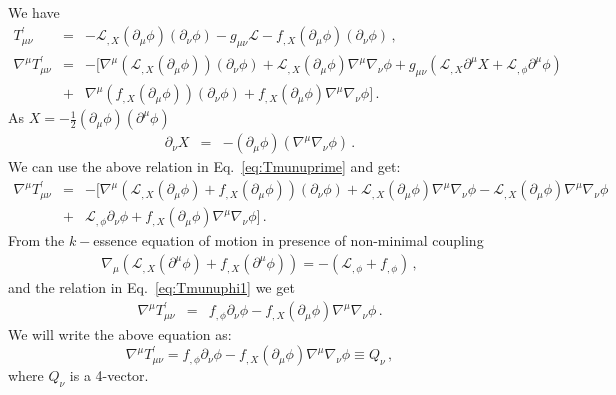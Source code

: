 \documentclass[a4paper,12pt]{article}
\begin{document}
We have
\begin{eqnarray}
T^{\prime}_{\mu\nu} &=& -\mathcal{L}_{,X} (\partial_{\mu}\phi)(\partial_{\nu}\phi) - g_{\mu\nu}\mathcal{L} - f_{,X}(\partial_{\mu}\phi)(\partial_{\nu}\phi)\,,\nonumber\\
\nabla^{\mu} T^{\prime}_{\mu\nu} &=& -[\nabla^{\mu} \left(\mathcal{L}_{,X}(\partial_{\mu}\phi)\right)(\partial_{\nu}\phi)+\mathcal{L}_{,X} (\partial_{\mu}\phi) \nabla^{\mu} \nabla_{\nu} \phi + g_{\mu\nu} (\mathcal{L}_{,X}\partial^{\mu}X+\mathcal{L}_{,\phi}\partial^{\mu}\phi) \nonumber\\
&+& \nabla^{\mu} \left(f_{,X}(\partial_{\mu}\phi)\right)(\partial_{\nu}\phi)+f_{,X} (\partial_{\mu}\phi) \nabla^{\mu} \nabla_{\nu} \phi]\,.
\label{eq:Tmunuprime}
\end{eqnarray}
As $X = -\frac12 {(\partial_{\mu}\phi)}{(\partial^{\mu}\phi)}$
\begin{eqnarray}
\partial_{\nu} X &=& -(\partial_{\mu}\phi) (\nabla^{\mu}\nabla_{\nu} \phi)\,.\nonumber
\end{eqnarray}
We can use the above relation in Eq.~\eqref{eq:Tmunuprime} and get:
\begin{eqnarray}
\nabla^{\mu} T^{\prime}_{\mu\nu} &=& -[\nabla^{\mu}\left(\mathcal{L}_{,X} (\partial_{\mu}\phi) +f_{,X}(\partial_{\mu}\phi)\right)(\partial_{\nu}\phi) +\mathcal{L}_{,X} (\partial_{\mu}\phi) \nabla^{\mu} \nabla_{\nu} \phi -\mathcal{L}_{,X} (\partial_{\mu}\phi) \nabla^{\mu} \nabla_{\nu} \phi \nonumber\\
&+& \mathcal{L}_{,\phi}\partial_{\nu}\phi +f_{,X} (\partial_{\mu}\phi) \nabla^{\mu} \nabla_{\nu} \phi]\,. 
\label{eq:Tmunuphi1}
\end{eqnarray}
From the $k-$essence equation of motion in presence of non-minimal coupling
\begin{eqnarray}
\nabla_{\mu}\left(\mathcal{L}_{,X} (\partial^{\mu}\phi) +f_{,X}(\partial^{\mu}\phi)\right) = -(\mathcal{L}_{,\phi}+f_{,\phi})\,,\nonumber
\end{eqnarray}
and the relation in Eq.~\eqref{eq:Tmunuphi1} we get
\begin{eqnarray}
\nabla^{\mu} T^{\prime}_{\mu\nu} &=&  f_{,\phi}\partial_{\nu}\phi - f_{,X}(\partial_{\mu}\phi) \nabla^{\mu} \nabla_{\nu} \phi\,.\nonumber
\end{eqnarray}
We will write the above equation as:
\begin{equation}
\nabla^{\mu} T^{\prime}_{\mu\nu} = f_{,\phi}\partial_{\nu}\phi - f_{,X}(\partial_{\mu}\phi) \nabla^{\mu} \nabla_{\nu} \phi \equiv Q_{\nu}\,,
\label{eq:coupling}
\end{equation}
where $Q_\nu$ is a 4-vector.
\end{document}
